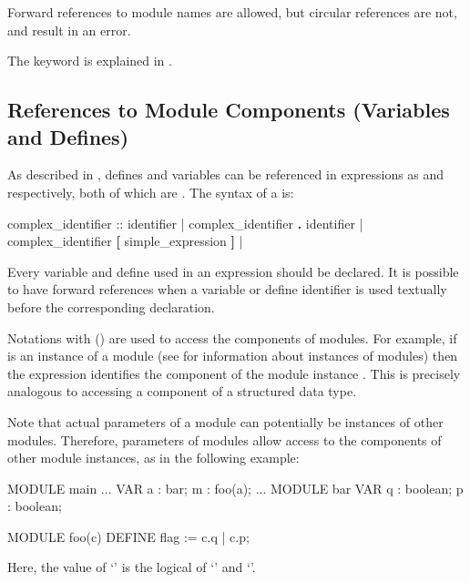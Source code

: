 \noindent Forward references to module names are allowed, but circular
references are not, and result in an error.

The keyword  is explained in .

\subsection{References to Module Components (Variables and Defines)}
\label{References to Module Components}

As described in , defines and variables
can be referenced in expressions as  and
 respectively, both of which are
.
%
The syntax of a  is:\\

\begin{Grammar}
complex_identifier ::
        identifier
      | complex_identifier \textbf{.} identifier
      | complex_identifier \textbf{[} simple_expression \textbf{]}
      | 
\end{Grammar}

Every variable and define used in an expression should be declared. It
is possible to have forward references when a variable or define
identifier is used textually before the corresponding declaration.

Notations with  () are used to access the
components of modules.
%
For example, if  is an instance of a module (see  for information about instances of modules) then the
expression  identifies the component  of the module
instance .
%
This is precisely analogous to accessing a component of a structured
data type.

Note that actual parameters of a module can potentially be instances
of other modules.
%
Therefore, parameters of modules allow access to the components of
other module instances, as in the following example:
%
\begin{nusmvCode}
MODULE main
...  VAR
  a : bar;
  m : foo(a);
...
MODULE bar
 VAR
   q : boolean;
   p : boolean;

MODULE foo(c)
 DEFINE
   flag := c.q | c.p;
\end{nusmvCode}
%
Here, the value of `' is the logical  of
`' and `'.


